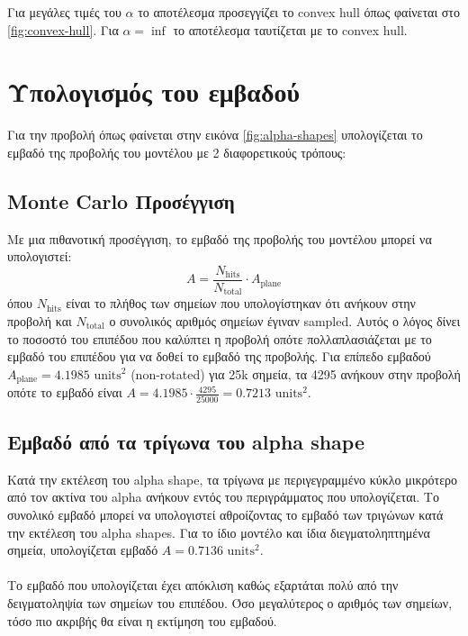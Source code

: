 \documentclass{report}
\begin{document}
 \label{fig:alpha-shapes}

 \label{fig:convex-hull}

Για μεγάλες τιμές του $\alpha$ το αποτέλεσμα προσεγγίζει το convex hull όπως φαίνεται στο \ref{fig:convex-hull}. Για
$\alpha = \inf$ το αποτέλεσμα ταυτίζεται με το convex hull.


\section{Υπολογισμός του εμβαδού}
Για την προβολή όπως φαίνεται στην εικόνα \ref{fig:alpha-shapes} υπολογίζεται το εμβαδό της προβολής του μοντέλου 
με 2 διαφορετικούς τρόπους:
\subsection{Monte Carlo Προσέγγιση}
Με μια πιθανοτική προσέγγιση, το εμβαδό της προβολής του μοντέλου μπορεί να υπολογιστεί:
\begin{equation}
    A = \frac{N_{\text{hits}}}{N_{\text{total}}} \cdot A_{\text{plane}}
\end{equation}
όπου $N_{\text{hits}}$ είναι το πλήθος των σημείων που υπολογίστηκαν ότι ανήκουν στην προβολή και $N_{\text{total}}$
ο συνολικός αριθμός σημείων έγιναν sampled. Αυτός ο λόγος δίνει το ποσοστό του επιπέδου που καλύπτει η προβολή
οπότε πολλαπλασιάζεται με το εμβαδό του επιπέδου για να δοθεί το εμβαδό της προβολής.
Για επίπεδο εμβαδού $A_{\text{plane}} = 4.1985 \text{ units}^2$ (non-rotated) για 25k σημεία, 
τα 4295 ανήκουν στην προβολή οπότε το εμβαδό είναι $A = 4.1985 \cdot \frac{4295}{25000} = 0.7213 \text{ units}^2$.

\subsection{Εμβαδό από τα τρίγωνα του alpha shape}
Κατά την εκτέλεση του alpha shape, τα τρίγωνα με περιγεγραμμένο κύκλο μικρότερο από τον ακτίνα του alpha ανήκουν εντός
του περιγράμματος που υπολογίζεται. Το συνολικό εμβαδό μπορεί να υπολογιστεί αθροίζοντας το εμβαδό των τριγώνων
κατά την εκτέλεση του alpha shapes. Για το ίδιο μοντέλο και ίδια διεγματοληπτημένα σημεία, υπολογίζεται εμβαδό
$A = 0.7136 \text{ units}^2$.
\\\\
Το εμβαδό που υπολογίζεται έχει απόκλιση καθώς εξαρτάται πολύ από την δειγματοληψία των σημείων του επιπέδου.
Όσο μεγαλύτερος ο αριθμός των σημείων, τόσο πιο ακριβής θα είναι η εκτίμηση του εμβαδού.
\end{document}
